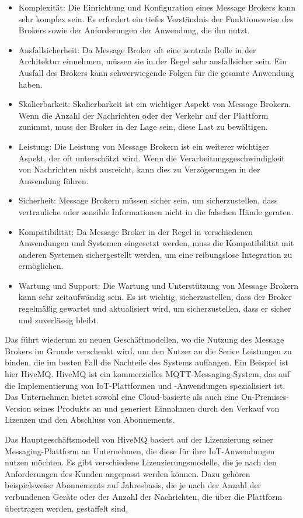 \begin{itemize}
\item Komplexität: Die Einrichtung und Konfiguration eines Message Brokers kann sehr komplex sein. Es erfordert ein tiefes Verständnis der Funktionsweise des Brokers sowie der Anforderungen der Anwendung, die ihn nutzt.
\item Ausfallsicherheit: Da Message Broker oft eine zentrale Rolle in der Architektur einnehmen, müssen sie in der Regel sehr ausfallsicher sein. Ein Ausfall des Brokers kann schwerwiegende Folgen für die gesamte Anwendung haben.
\item Skalierbarkeit: Skalierbarkeit ist ein wichtiger Aspekt von Message Brokern. Wenn die Anzahl der Nachrichten oder der Verkehr auf der Plattform zunimmt, muss der Broker in der Lage sein, diese Last zu bewältigen.
\item Leistung: Die Leistung von Message Brokern ist ein weiterer wichtiger Aspekt, der oft unterschätzt wird. Wenn die Verarbeitungsgeschwindigkeit von Nachrichten nicht ausreicht, kann dies zu Verzögerungen in der Anwendung führen.
\item Sicherheit: Message Brokern müssen sicher sein, um sicherzustellen, dass vertrauliche oder sensible Informationen nicht in die falschen Hände geraten.
\item Kompatibilität: Da Message Broker in der Regel in verschiedenen Anwendungen und Systemen eingesetzt werden, muss die Kompatibilität mit anderen Systemen sichergestellt werden, um eine reibungslose Integration zu ermöglichen.
\item Wartung und Support: Die Wartung und Unterstützung von Message Brokern kann sehr zeitaufwändig sein. Es ist wichtig, sicherzustellen, dass der Broker regelmäßig gewartet und aktualisiert wird, um sicherzustellen, dass er sicher und zuverlässig bleibt.
\end{itemize}
Das führt wiederum zu neuen Geschäftmodellen, wo die Nutzung des Message Brokers im Grunde verschenkt wird, um den Nutzer an die Serice Leistungen zu binden, die im besten Fall die Nachteile des Systems auffangen. 
Ein Beispiel ist hier HiveMQ. HiveMQ ist ein kommerzielles MQTT-Messaging-System, das auf die Implementierung von IoT-Plattformen und -Anwendungen spezialisiert ist. Das Unternehmen bietet sowohl eine Cloud-basierte als auch eine On-Premises-Version seines Produkts an und generiert Einnahmen durch den Verkauf von Lizenzen und den Abschluss von Abonnements.

Das Hauptgeschäftsmodell von HiveMQ basiert auf der Lizenzierung seiner Messaging-Plattform an Unternehmen, die diese für ihre IoT-Anwendungen nutzen möchten. Es gibt verschiedene Lizenzierungsmodelle, die je nach den Anforderungen des Kunden angepasst werden können. Dazu gehören beispielsweise Abonnements auf Jahresbasis, die je nach der Anzahl der verbundenen Geräte oder der Anzahl der Nachrichten, die über die Plattform übertragen werden, gestaffelt sind.

